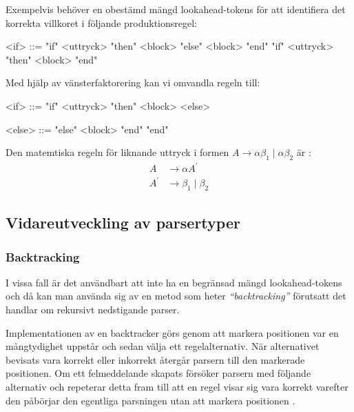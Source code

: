 Exempelvis behöver en obestämd mängd lookahead-tokens för att identifiera
det korrekta villkoret i följande produktionsregel:

\setlength{\grammarindent}{5em}
\begin{grammar}
  \singlespace\small%
  \selectfont
  <if> ::= "if" <uttryck> "then" <block> "else" <block> "end"
    \alt "if" <uttryck> "then" <block> "end"
\end{grammar}

Med hjälp av vänsterfaktorering kan vi omvandla regeln till:

\setlength{\grammarindent}{5em}
\begin{grammar}
  \singlespace\small%
  \selectfont
  <if> ::= "if" <uttryck> "then" <block> <else>

  <else> ::= "else" <block> "end"
    \alt "end"
\end{grammar}


Den matemtiska regeln för liknande uttryck i formen $A \rightarrow
\alpha\beta_1\;|\;\alpha\beta_2 $ är \citep[s. 214]{aa06}:
\begin{align*}
A &\rightarrow \alpha A^\prime \\
A^\prime &\rightarrow \beta_1\;|\;\beta_2
\end{align*}

\subsection{Vidareutveckling av parsertyper}

\subsubsection{Backtracking}

I vissa fall är det användbart att inte ha en begränsad mängd lookahead-tokens
och då kan man använda sig av en metod som heter \textit{``backtracking''}
förutsatt det handlar om rekursivt nedstigande parser.

Implementationen av en backtracker görs genom att markera positionen var en
mångtydighet uppstår och sedan välja ett regelalternativ. När alternativet
bevisats vara korrekt eller inkorrekt återgår parsern till den markerade
positionen. Om ett felmeddelande skapats försöker parsern med följande
alternativ och repeterar detta fram till att en regel visar sig vara korrekt
varefter den påbörjar den egentliga parsningen utan att markera positionen
\citep[s. 57]{pt10}.

